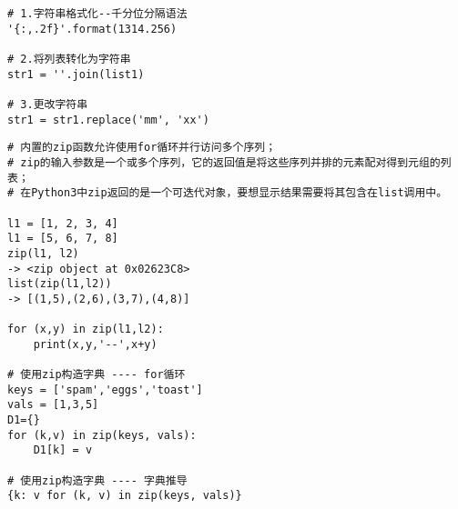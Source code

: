 \documentclass[a4paper]{ctexart}    %
\begin{document}
\begin{tcolorbox}[
         colback=red!5!white,
         colframe=teal,
         title=\textbf{字符串}
    ]
\begin{verbatim}
# 1.字符串格式化--千分位分隔语法
'{:,.2f}'.format(1314.256)

# 2.将列表转化为字符串
str1 = ''.join(list1)

# 3.更改字符串
str1 = str1.replace('mm', 'xx')
\end{verbatim}
\end{tcolorbox}

\newpage
\begin{tcolorbox}[
         colback=red!5!white,
         colframe=teal,
         title=\textbf{zip}
    ]
\begin{verbatim}
# 内置的zip函数允许使用for循环并行访问多个序列；
# zip的输入参数是一个或多个序列，它的返回值是将这些序列并排的元素配对得到元组的列表；
# 在Python3中zip返回的是一个可迭代对象，要想显示结果需要将其包含在list调用中。

l1 = [1, 2, 3, 4]
l1 = [5, 6, 7, 8]
zip(l1, l2)
-> <zip object at 0x02623C8>
list(zip(l1,l2))
-> [(1,5),(2,6),(3,7),(4,8)]

for (x,y) in zip(l1,l2):
    print(x,y,'--',x+y)

# 使用zip构造字典 ---- for循环
keys = ['spam','eggs','toast']
vals = [1,3,5]
D1={}
for (k,v) in zip(keys, vals):
    D1[k] = v

# 使用zip构造字典 ---- 字典推导
{k: v for (k, v) in zip(keys, vals)}
\end{verbatim}
\end{tcolorbox}
\end{document}
